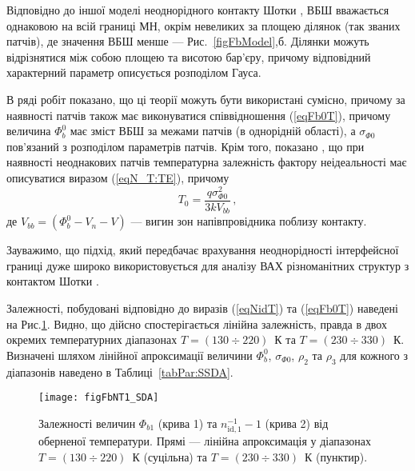 Відповідно до іншої моделі неоднорідного контакту Шотки \cite{Sullivan,Tung:PhysRev,Tung:MSE,Tung:ApplPhysRev}, ВБШ вважається однаковою на всій границі МН,
окрім невеликих за площею ділянок (так званих патчів), де значення ВБШ менше --- Рис.~\ref{figFbModel},б.
Ділянки можуть відрізнятися між собою площею та висотою бар'єру, причому відповідний характерний параметр описується розподілом Гауса.

В ряді робіт \cite{Iucolano2007JAP, Iucolano2007APL} показано, що ці теорії можуть бути використані сумісно,
причому за наявності патчів також має виконуватися співвідношення (\ref{eqFb0T}),
причому величина $\Phi_b^0$ має зміст ВБШ за межами патчів (в однорідній області),
а $\sigma_{\Phi0}$ пов'язаний з розподілом параметрів патчів.
Крім того, показано \cite{Sullivan,Tung:PhysRev,Iucolano2007JAP, Iucolano2007APL}, що при наявності неоднакових патчів
температурна залежність фактору неідеальності має описуватися виразом (\ref{eqN_T:TE}), причому
\begin{equation} \label{eqN_T0}
T_0=\frac{q\sigma_{\Phi0}^2}{3kV_{bb}}\,,
\end{equation}
де
$V_{bb}=(\Phi_b^0-V_n-V)$ --- вигин зон напівпровідника поблизу контакту.

Зауважимо, що підхід, який передбачає  врахування неоднорідності
інтерфейсної границі дуже широко використовується  для аналізу ВАХ різноманітних структур з контактом Шотки
\cite{Soylu,GELCZUK2014,Mohan,Yildirim2010,JYOTHI2015,DURMUS2014,KHURE2015,OZAVCI2013,Cetin2005,Karatas:2006NIMA,Sarpatwari,
Tascioglu2010, Yildirim2010, Mamor, Iucolano2007JAP, Iucolano2007APL,Li2016}.

Залежності, побудовані відповідно до виразів (\ref{eqNidT}) та (\ref{eqFb0T}) наведені на Рис.\ref{figFbNT1_SDA}.
Видно, що дійсно спостерігається лінійна залежність,
правда в двох окремих температурних діапазонах $T=(130\div220)$~К та $T=(230\div330)$~К.
Визначені шляхом лінійної апроксимації величини $\Phi_{b}^0$, $\sigma_{\Phi0}$, $\rho_2$ та $\rho_3$ для кожного з діапазонів
наведено в Таблиці~\ref{tabPar:SSDA}.

\begin{figure}
\center
\texttt{[image: figFbNT1\_SDA]}
\caption{\label{figFbNT1_SDA}
Залежності величин $\Phi_{b1}$ (крива 1) та $n_{\mathrm{id},1}^{-1}-1$ (крива 2) від оберненої температури.
Прямі --- лінійна апроксимація у діапазонах $T=(130\div220)$~К (суцільна) та $T=(230\div330)$~К (пунктир).
}%
\end{figure}

